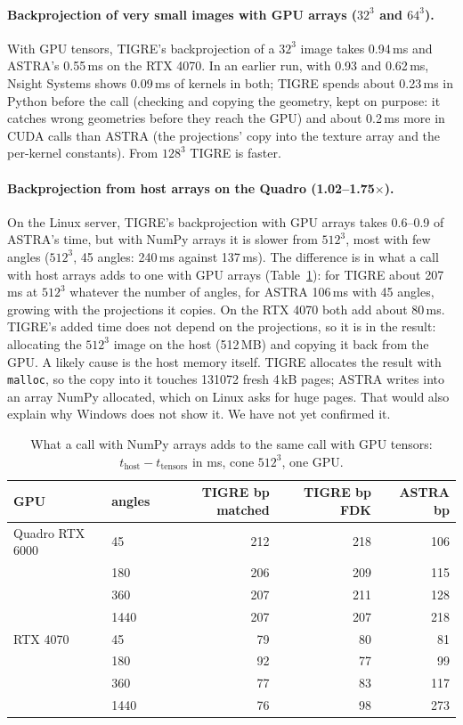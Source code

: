 \documentclass[11pt,a4paper]{article}
\begin{document}
\paragraph{Backprojection of very small images with GPU arrays ($32^3$ and $64^3$).}
With GPU tensors, TIGRE's backprojection of a $32^3$ image takes 0.94\,ms and ASTRA's 0.55\,ms on the RTX 4070.
In an earlier run, with 0.93 and 0.62\,ms, Nsight Systems
shows 0.09\,ms of kernels in both; TIGRE spends about 0.23\,ms in Python before the call (checking and copying
the geometry, kept on purpose: it catches wrong geometries before they reach the GPU) and about 0.2\,ms more in
CUDA calls than ASTRA (the projections' copy into the texture array and the per-kernel constants). From $128^3$
TIGRE is faster.

\paragraph{Backprojection from host arrays on the Quadro (1.02--1.75$\times$).}
On the Linux server, TIGRE's backprojection with GPU arrays takes 0.6--0.9 of ASTRA's time, but with NumPy arrays
it is slower from $512^3$, most with few angles ($512^3$, 45 angles: 240\,ms against 137\,ms). The difference is
in what a call with host arrays adds to one with GPU arrays (Table~\ref{tab:hostcost}): for TIGRE about 207\,ms at
$512^3$ whatever the number of angles, for ASTRA 106\,ms with 45 angles, growing with the projections it copies.
On the RTX 4070 both add about 80\,ms. TIGRE's added time does not depend on the projections, so it is in the
result: allocating the $512^3$ image on the host (512\,MB) and copying it back from the GPU. A likely cause is the
host memory itself. TIGRE allocates the result with \texttt{malloc}, so the copy into it touches 131072 fresh
4\,kB pages; ASTRA writes into an array NumPy allocated, which on Linux asks for huge pages. That would also
explain why Windows does not show it. We have not yet confirmed it.

\begin{table}[H]
\centering\small
\caption{What a call with NumPy arrays adds to the same call with GPU tensors: $t_\text{host}-t_\text{tensors}$
in ms, cone $512^3$, one GPU.}
\label{tab:hostcost}
\begin{tabular}{llrrr}
\toprule
GPU & angles & TIGRE bp matched & TIGRE bp FDK & ASTRA bp \\
\midrule
Quadro RTX 6000 & 45 & 212 & 218 & 106 \\
 & 180 & 206 & 209 & 115 \\
 & 360 & 207 & 211 & 128 \\
 & 1440 & 207 & 207 & 218 \\
\addlinespace[2pt]
RTX 4070 & 45 & 79 & 80 & 81 \\
 & 180 & 92 & 77 & 99 \\
 & 360 & 77 & 83 & 117 \\
 & 1440 & 76 & 98 & 273 \\
\bottomrule
\end{tabular}
\end{table}
\end{document}
